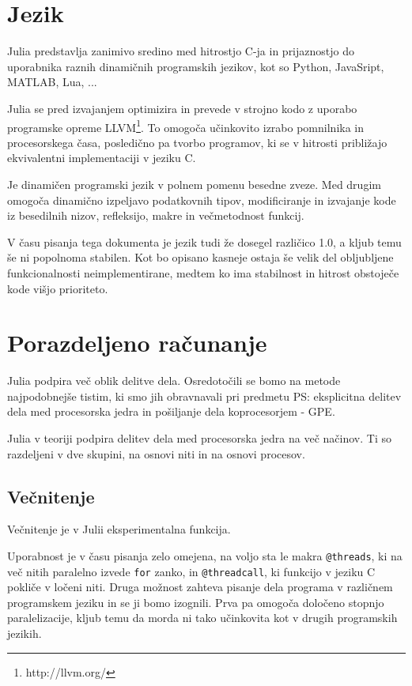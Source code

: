 \documentclass[journal,a4paper,twoside]{sty/IEEEtran}
\begin{document}
\section{Jezik}

Julia predstavlja zanimivo sredino med hitrostjo C-ja in prijaznostjo do uporabnika raznih dinamičnih programskih jezikov, kot so Python, JavaSript,
	MATLAB, Lua, ...

Julia se pred izvajanjem optimizira in prevede v strojno kodo z uporabo programske opreme LLVM\footnote{http://llvm.org/}.
To omogoča učinkovito izrabo pomnilnika in procesorskega časa, posledično pa tvorbo programov, ki se v hitrosti približajo ekvivalentni implementaciji v
	jeziku C.\cite{julia-benchmarks}

Je dinamičen programski jezik v polnem pomenu besedne zveze.
Med drugim omogoča dinamično izpeljavo podatkovnih tipov, modificiranje in izvajanje kode iz besedilnih nizov,\cite{julia-metaprogramming} refleksijo, makre in večmetodnost
	funkcij.

V času pisanja tega dokumenta je jezik tudi že dosegel različico 1.0, a kljub temu še ni popolnoma stabilen.
Kot bo opisano kasneje ostaja še velik del obljubljene funkcionalnosti neimplementirane, medtem ko ima stabilnost in hitrost obstoječe kode višjo
	prioriteto.

\section{Porazdeljeno računanje}

Julia podpira več oblik delitve dela.
Osredotočili se bomo na metode najpodobnejše tistim, ki smo jih obravnavali pri predmetu PS: eksplicitna delitev dela med procesorska jedra in pošiljanje
	dela koprocesorjem - GPE.

Julia v teoriji podpira delitev dela med procesorska jedra na več načinov.
Ti so razdeljeni v dve skupini, na osnovi niti in na osnovi procesov.

\subsection{Večnitenje}

Večnitenje je v Julii eksperimentalna funkcija.

Uporabnost je v času pisanja zelo omejena, na voljo sta le makra \texttt{@threads}, ki na več nitih paralelno izvede \texttt{for} zanko, in
	\texttt{@threadcall}, ki funkcijo v jeziku C pokliče v ločeni niti.\cite{julia-multithreading}
Druga možnost zahteva pisanje dela programa v različnem programskem jeziku in se ji bomo izognili.
Prva pa omogoča določeno stopnjo paralelizacije, kljub temu da morda ni tako učinkovita kot v drugih programskih jezikih.
\end{document}
